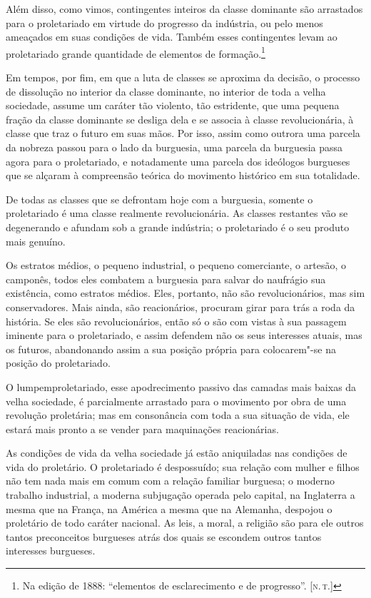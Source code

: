Além disso, como vimos, contingentes inteiros da classe
dominante são arrastados para o proletariado em virtude do progresso da
indústria, ou pelo menos ameaçados em suas condições de vida.
Também esses contingentes levam ao proletariado grande quantidade de
elementos de
formação.\footnote{Na edição de 1888: ``elementos de esclarecimento e de 
progresso''. [\textsc{n.\,t.}]}

Em tempos, por fim, em que a luta de classes se aproxima da decisão, o
processo de dissolução no interior da classe dominante, no interior de
toda a velha sociedade, assume um caráter tão violento, tão estridente,
que uma pequena fração da classe dominante se desliga dela e se associa
à classe revolucionária, à classe que traz o futuro em suas mãos. Por
isso, assim como outrora uma parcela da nobreza passou para o lado da
burguesia, uma parcela da burguesia passa agora para o proletariado, e
notadamente uma parcela dos ideólogos burgueses que se alçaram à
compreensão teórica do movimento histórico em sua totalidade.

De todas as classes que se defrontam hoje com a burguesia, somente o
proletariado é uma classe realmente revolucionária. As classes
restantes vão se degenerando e afundam sob a grande indústria; o
proletariado é o seu produto mais genuíno.

Os estratos médios, o pequeno industrial, o pequeno comerciante, o
artesão, o camponês, todos eles combatem a burguesia para salvar do naufrágio sua
existência, como estratos médios. Eles, portanto, não
são revolucionários, mas sim conservadores. Mais ainda, são
reacionários, procuram girar para trás a roda da história. Se eles são
revolucionários, então só o são com vistas à sua passagem iminente para
o proletariado, e assim defendem não os seus interesses atuais, mas os
futuros, abandonando assim a sua posição própria para colocarem"-se na
posição do proletariado.

O lumpemproletariado, esse apodrecimento passivo das camadas mais baixas
da velha sociedade, é parcialmente arrastado para o movimento por obra
de uma revolução proletária; mas em consonância com toda a sua situação
de vida, ele estará mais pronto a se vender para maquinações
reacionárias.

As condições de vida da velha sociedade já estão aniquiladas nas
condições de vida do proletário. O proletariado é despossuído; sua
relação com mulher e filhos não tem nada mais em comum com a relação
familiar burguesa; o moderno trabalho industrial, a moderna subjugação
operada pelo capital, na Inglaterra a mesma que na França, na América a
mesma que na Alemanha, despojou o proletário de todo caráter nacional.
As leis, a moral, a religião são para ele outros tantos preconceitos
burgueses atrás dos quais se escondem outros tantos interesses
burgueses.

